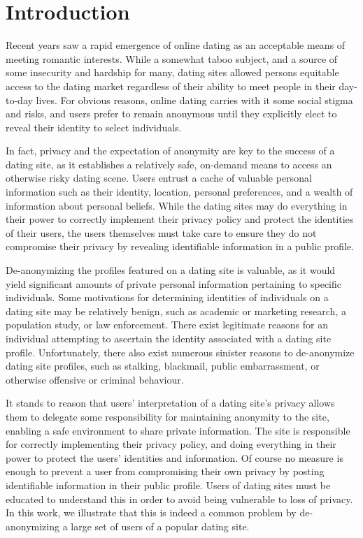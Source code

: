 \section{Introduction}
\label{sec:intro}

Recent years saw a rapid emergence of online dating as an acceptable means of meeting romantic interests.
While a somewhat taboo subject, and a source of some insecurity and hardship for many, dating sites allowed persons equitable access to the dating market regardless of their ability to meet people in their day-to-day lives.
For obvious reasons, online dating carries with it some social stigma and risks, and users prefer to remain anonymous until they explicitly elect to reveal their identity to select individuals.

In fact, privacy and the expectation of anonymity are key to the success of a dating site, as it establishes a relatively safe, on-demand means to access an otherwise risky dating scene.
Users entrust a cache of valuable personal information such as their identity, location, personal preferences, and a wealth of information about personal beliefs.
While the dating sites may do everything in their power to correctly implement their privacy policy and protect the identities of their users, the users themselves must take care to ensure they do not compromise their privacy by revealing identifiable information in a public profile.

De-anonymizing the profiles featured on a dating site is valuable, as it would yield significant amounts of private personal information pertaining to specific individuals.
Some motivations for determining identities of individuals on a dating site may be relatively benign, such as academic or marketing research, a population study, or law enforcement.
There exist legitimate reasons for an individual attempting to ascertain the identity associated with a dating site profile.
Unfortunately, there also exist numerous sinister reasons to de-anonymize dating site profiles, such as stalking, blackmail, public embarrassment, or otherwise offensive or criminal behaviour.

It stands to reason that users' interpretation of a dating site's privacy allows them to delegate some responsibility for maintaining anonymity to the site, enabling a safe environment to share private information.
The site is responsible for correctly implementing their privacy policy, and doing everything in their power to protect the users' identities and information.
Of course no measure is enough to prevent a user from compromising their own privacy by posting identifiable information in their public profile.
Users of dating sites must be educated to understand this in order to avoid being vulnerable to loss of privacy.
In this work, we illustrate that this is indeed a common problem by de-anonymizing a large set of users of a popular dating site.

